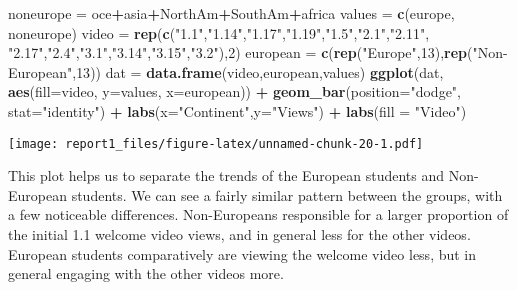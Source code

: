 \documentclass[
]{article}
\newenvironment{Shaded}{\begin{snugshade}}{\end{snugshade}}
\newcommand{\DataTypeTok}[1]{\textcolor[rgb]{0.13,0.29,0.53}{#1}}
\newcommand{\DecValTok}[1]{\textcolor[rgb]{0.00,0.00,0.81}{#1}}
\newcommand{\KeywordTok}[1]{\textcolor[rgb]{0.13,0.29,0.53}{\textbf{#1}}}
\newcommand{\NormalTok}[1]{#1}
\newcommand{\OperatorTok}[1]{\textcolor[rgb]{0.81,0.36,0.00}{\textbf{#1}}}
\newcommand{\StringTok}[1]{\textcolor[rgb]{0.31,0.60,0.02}{#1}}
\begin{document}
\begin{Shaded}
\begin{Highlighting}[]
\NormalTok{noneurope =}\StringTok{ }\NormalTok{oce}\OperatorTok{+}\NormalTok{asia}\OperatorTok{+}\NormalTok{NorthAm}\OperatorTok{+}\NormalTok{SouthAm}\OperatorTok{+}\NormalTok{africa}
\NormalTok{values =}\StringTok{ }\KeywordTok{c}\NormalTok{(europe, noneurope)}
\NormalTok{video =}\StringTok{ }\KeywordTok{rep}\NormalTok{(}\KeywordTok{c}\NormalTok{(}\StringTok{"1.1"}\NormalTok{,}\StringTok{"1.14"}\NormalTok{,}\StringTok{"1.17"}\NormalTok{,}\StringTok{"1.19"}\NormalTok{,}\StringTok{"1.5"}\NormalTok{,}\StringTok{"2.1"}\NormalTok{,}\StringTok{"2.11"}\NormalTok{,}
              \StringTok{"2.17"}\NormalTok{,}\StringTok{"2.4"}\NormalTok{,}\StringTok{"3.1"}\NormalTok{,}\StringTok{"3.14"}\NormalTok{,}\StringTok{"3.15"}\NormalTok{,}\StringTok{"3.2"}\NormalTok{),}\DecValTok{2}\NormalTok{)}
\NormalTok{european =}\StringTok{ }\KeywordTok{c}\NormalTok{(}\KeywordTok{rep}\NormalTok{(}\StringTok{"Europe"}\NormalTok{,}\DecValTok{13}\NormalTok{),}\KeywordTok{rep}\NormalTok{(}\StringTok{"Non-European"}\NormalTok{,}\DecValTok{13}\NormalTok{))}
\NormalTok{dat =}\StringTok{ }\KeywordTok{data.frame}\NormalTok{(video,european,values)}
\KeywordTok{ggplot}\NormalTok{(dat, }\KeywordTok{aes}\NormalTok{(}\DataTypeTok{fill=}\NormalTok{video, }\DataTypeTok{y=}\NormalTok{values, }\DataTypeTok{x=}\NormalTok{european)) }\OperatorTok{+}\StringTok{ }
\StringTok{  }\KeywordTok{geom_bar}\NormalTok{(}\DataTypeTok{position=}\StringTok{"dodge"}\NormalTok{, }\DataTypeTok{stat=}\StringTok{"identity"}\NormalTok{) }\OperatorTok{+}\StringTok{ }\KeywordTok{labs}\NormalTok{(}\DataTypeTok{x=}\StringTok{"Continent"}\NormalTok{,}\DataTypeTok{y=}\StringTok{"Views"}\NormalTok{) }\OperatorTok{+}\StringTok{ }
\StringTok{  }\KeywordTok{labs}\NormalTok{(}\DataTypeTok{fill =} \StringTok{"Video"}\NormalTok{)}
\end{Highlighting}
\end{Shaded}

\texttt{[image: report1\_files/figure-latex/unnamed-chunk-20-1.pdf]}

This plot helps us to separate the trends of the European students and
Non-European students. We can see a fairly similar pattern between the
groups, with a few noticeable differences. Non-Europeans responsible for
a larger proportion of the initial 1.1 welcome video views, and in
general less for the other videos. European students comparatively are
viewing the welcome video less, but in general engaging with the other
videos more.
\end{document}
